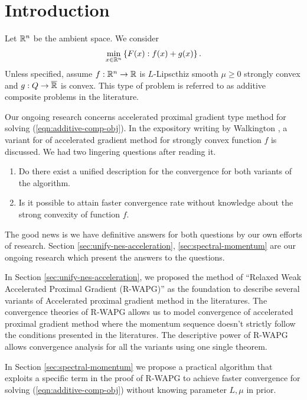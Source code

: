 \documentclass[12pt]{article}
\begin{document}
\section{Introduction}
    Let $\mathbb R^n$ be the ambient space. We consider 
    \begin{align}
        \min_{x \in \mathbb R^n} \left\lbrace
            F(x): f(x) + g(x)
        \right\rbrace.
    \end{align}\label{eqn:additive-comp-obj}
    Unless specified, assume $f:\mathbb R^n \rightarrow \mathbb R$ is $L$-Lipscthiz smooth $\mu \ge 0$ strongly convex and $g:Q \rightarrow \overline {\mathbb R}$ is convex. 
    This type of problem is referred to as additive composite problems in the literature. 
    \par
    Our ongoing research concerns accelerated proximal gradient type method for solving (\ref{eqn:additive-comp-obj}). 
    In the expository writing by Walkington \cite{noel_nesterovs_nodate}, a variant for of accelerated gradient method for strongly convex function $f$ is discussed. 
    We had two lingering questions after reading it. 
    \begin{enumerate}
        \item Do there exist a unified description for the convergence for both variants of the algorithm. 
        \item Is it possible to attain faster convergence rate without knowledge about the strong convexity of function $f$. 
    \end{enumerate}
    The good news is we have definitive answers for both questions by our own efforts of research. 
    Section \ref{sec:unify-nes-acceleration}, \ref{sec:spectral-momentum} are our ongoing research which present the answers to the questions. 
    \par
    In Section \ref{sec:unify-nes-acceleration}, we proposed the method of ``Relaxed Weak Accelerated Proximal Gradient (R-WAPG)'' as the foundation to describe several variants of Accelerated proximal gradient method in the literatures. 
    The convergence theories of R-WAPG allows us to model convergence of accelerated proximal gradient method where the momentum sequence doesn't strictly follow the conditions presented in the literatures. 
    The descriptive power of R-WAPG allows convergence analysis for all the variants using one single theorem. 
    \par
    In Section \ref{sec:spectral-momentum} we propose a practical algorithm that exploits a specific term in the proof of R-WAPG to achieve faster convergence for solving (\ref{eqn:additive-comp-obj}) without knowing parameter $L, \mu$ in prior. 
\end{document}
